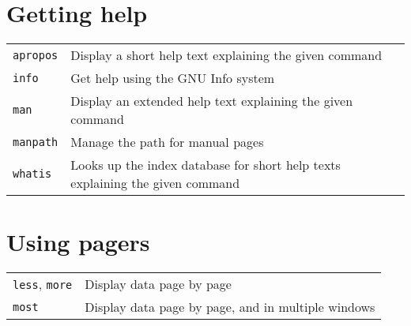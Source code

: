 \documentclass[10pt]{article}
\begin{document}
\begin{multicols}{2}   

\section{Getting help}
\begin{tabular}{ p{2.5cm} p{8.5cm} }
  \hline
  \texttt{apropos} & Display a short help text explaining the given command \\
  \rowcolor{Gray}
  \texttt{info} & Get help using the GNU Info system \\
  \texttt{man} & Display an extended help text explaining the given command \\
  \rowcolor{Gray}
  \texttt{manpath} & Manage the path for manual pages \\
  \texttt{whatis} & Looks up the index database for short help texts explaining the given command\\
  \hline
\end{tabular}

\section{Using pagers}
\begin{tabular}{ p{2.5cm} p{8.5cm} }
  \hline
  \texttt{less}, \texttt{more} & Display data page by page \\
  \rowcolor{Gray}
  \texttt{most} & Display data page by page, and in multiple windows \\
  \hline
\end{tabular}


\end{multicols}
\end{document}
